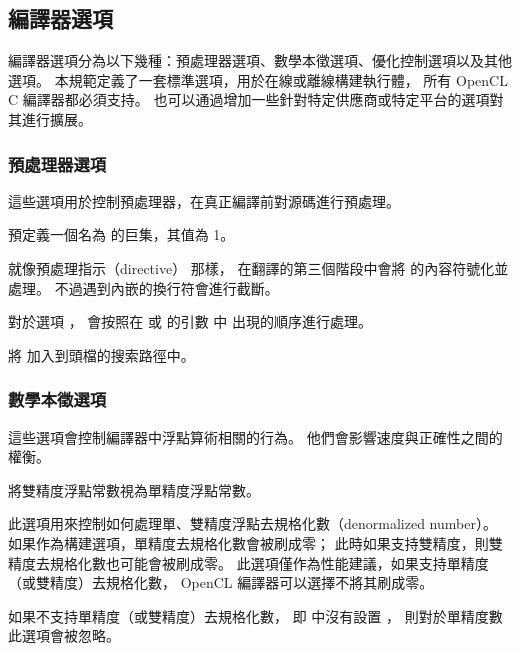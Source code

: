 \subsection[section:compilerOption]{編譯器選項}

編譯器選項分為以下幾種：預處理器選項、數學本徵選項、優化控制選項以及其他選項。
本規範定義了一套標準選項，用於在線或離線構建執行體，
所有 OpenCL C 編譯器都必須支持。
也可以通過增加一些針對特定供應商或特定平台的選項對其進行擴展。

\subsubsection[section:preprocessorOption]{預處理器選項}

這些選項用於控制預處理器，在真正編譯前對源碼進行預處理。

預定義一個名為  的巨集，其值為 1。
\stopclOption

就像預處理指示（directive）  那樣，
在翻譯的第三個階段中會將  的內容符號化並處理。
不過遇到內嵌的換行符會進行截斷。
\stopclOption

對於選項 ，
會按照在  或  的引數  中
出現的順序進行處理。

將  加入到頭檔的搜索路徑中。
\stopclOption

\subsubsection[section:MathIntrinsicsOption]{數學本徵選項}
這些選項會控制編譯器中浮點算術相關的行為。
他們會影響速度與正確性之間的權衡。

將雙精度浮點常數視為單精度浮點常數。
\stopclOption

此選項用來控制如何處理單、雙精度浮點去規格化數（denormalized number）。
如果作為構建選項，單精度去規格化數會被刷成零；
此時如果支持雙精度，則雙精度去規格化數也可能會被刷成零。
此選項僅作為性能建議，如果支持單精度（或雙精度）去規格化數，
OpenCL 編譯器可以選擇不將其刷成零。

如果不支持單精度（或雙精度）去規格化數，
即  中沒有設置 ，
則對於單精度數此選項會被忽略。

